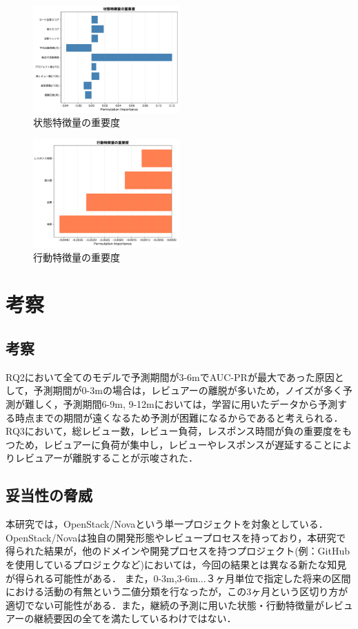 \documentclass[submit,techrep,noauthor]{ipsj}
\begin{document}
\begin{figure}[h]
    \centering
\includegraphics[width=0.5\textwidth]{./Hashimoto_fig/state.pdf}
    \caption{状態特徴量の重要度}
    \label{fig:State}
\end{figure}

\begin{figure}[h]
    \centering
\includegraphics[width=0.5\textwidth]{./Hashimoto_fig/action.pdf}
    \caption{行動特徴量の重要度}
    \label{fig:Action}
\end{figure}


\section{考察}
\label{sec:discussion}
\subsection{考察}
RQ2において全てのモデルで予測期間が3-6mでAUC-PRが最大であった原因として，予測期間が0-3mの場合は，レビュアーの離脱が多いため，ノイズが多く予測が難しく，予測期間6-9m, 9-12mにおいては，学習に用いたデータから予測する時点までの期間が遠くなるため予測が困難になるからであると考えられる．RQ3において，総レビュー数，レビュー負荷，レスポンス時間が負の重要度をもつため，レビュアーに負荷が集中し，レビューやレスポンスが遅延することによりレビュアーが離脱することが示唆された．

\subsection{妥当性の脅威}
本研究では，OpenStack/Novaという単一プロジェクトを対象としている．OpenStack/Novaは独自の開発形態やレビュープロセスを持っており，本研究で得られた結果が，他のドメインや開発プロセスを持つプロジェクト(例：GitHubを使用しているプロジェクなど)においては，今回の結果とは異なる新たな知見が得られる可能性がある．
また，0-3m,3-6m...３ヶ月単位で指定した将来の区間における活動の有無という二値分類を行なったが，この3ヶ月という区切り方が適切でない可能性がある．また，継続の予測に用いた状態・行動特徴量がレビュアーの継続要因の全てを満たしているわけではない．
\end{document}
